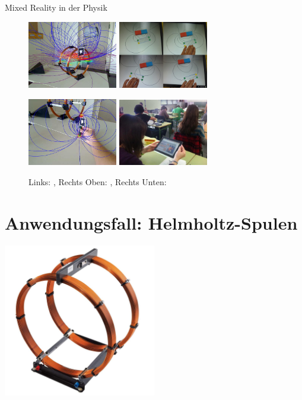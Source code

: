 \begin{frame}[fragile]{Mixed Reality in der Physik}

\begin{figure}
	\includegraphics[width=0.35\textwidth]{images/Buchau09.jpg}
	\hspace{0.05cm}
	\includegraphics[width=0.35\textwidth]{images/Matsutomo13.jpg}

	\includegraphics[width=0.35\textwidth]{images/Buchau09_Magnet.jpg}
	\hspace{0.05cm}
	\includegraphics[width=0.35\textwidth]{images/Ibanez14.jpg}

	\setlength{\abovecaptionskip}{5pt plus 5pt minus 2pt}
	\caption*{Links: \citep{Buchau09}, Rechts Oben: \cite{Matsutomo13}, Rechts Unten: \cite{Ibanez14}}
\end{figure}
\end{frame}

\part{Anwendungsfall: Helmholtz-Spulen}
\label{part:physics}
\begin{frame}[fragile]{}
\begin{center}
	\includegraphics[width=0.5\textwidth]{images/Helmholtz.jpg}	
\end{center}
\end{frame}